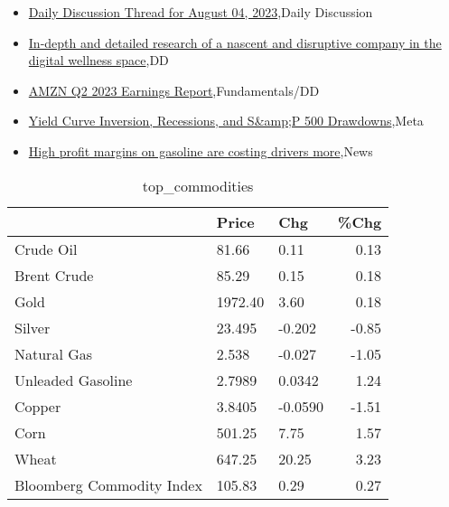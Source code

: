 \documentclass{article}%
\begin{document}
%
\begin{itemize}%
\item%
\href{https://reddit.com/r/wallstreetbets/comments/15hvu3r/daily\_discussion\_thread\_for\_august\_04\_2023/}{Daily Discussion Thread for August 04, 2023},Daily Discussion%
\item%
\href{https://reddit.com/r/Baystreetbets/comments/15hu3iq/indepth\_and\_detailed\_research\_of\_a\_nascent\_and/}{In-depth and detailed research of a nascent and disruptive company in the digital wellness space},DD%
\item%
\href{https://reddit.com/r/StockMarket/comments/15hkh7n/amzn\_q2\_2023\_earnings\_report/}{AMZN Q2 2023 Earnings Report},Fundamentals/DD%
\item%
\href{https://reddit.com/r/StockMarket/comments/15hcn61/yield\_curve\_inversion\_recessions\_and\_sp\_500/}{Yield Curve Inversion, Recessions, and S\&amp;P 500 Drawdowns},Meta%
\item%
\href{https://reddit.com/r/Economics/comments/15hgj8h/high\_profit\_margins\_on\_gasoline\_are\_costing/}{High profit margins on gasoline are costing drivers more},News%
\end{itemize}%


\begin{table}[htbp]%
\caption{top\_commodities}%
\centering%
\begin{adjustbox}{width=1\textwidth}%
\begin{tabular}{lllr}
\toprule
                          &   Price &     Chg &  \%Chg \\
\midrule
               Crude Oil  &   81.66 &    0.11 &  0.13 \\
             Brent Crude  &   85.29 &    0.15 &  0.18 \\
                    Gold  & 1972.40 &    3.60 &  0.18 \\
                  Silver  &  23.495 &  -0.202 & -0.85 \\
             Natural Gas  &   2.538 &  -0.027 & -1.05 \\
       Unleaded Gasoline  &  2.7989 &  0.0342 &  1.24 \\
                  Copper  &  3.8405 & -0.0590 & -1.51 \\
                    Corn  &  501.25 &    7.75 &  1.57 \\
                   Wheat  &  647.25 &   20.25 &  3.23 \\
Bloomberg Commodity Index &  105.83 &    0.29 &  0.27 \\
\bottomrule
\end{tabular}
%
\end{adjustbox}%
\end{table}
\end{document}
